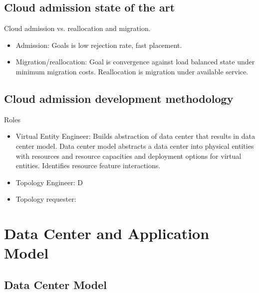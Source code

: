 \documentclass[conference]{IEEEtran}
\begin{document}
\subsection{Cloud admission state of the art}

Cloud admission vs. reallocation and migration.
\begin{itemize}
\item Admission: Goals is low rejection rate, fast placement.
\item Migration/reallocation: Goal is convergence against load balanced state under minimum migration costs. Reallocation is migration under available service.
\end{itemize}

\subsection{Cloud admission development methodology}

Roles
\begin{itemize}
	\item Virtual Entity Engineer: Builds abstraction of data center that results in data center model. Data center model abstracts a data center into physical entities with resources and resource capacities and deployment options for virtual entities. Identifies resource feature interactions.
	\item Topology Engineer: D
	\item Topology requester:
\end{itemize}
%

\section{Data Center and Application Model}

\subsection{Data Center Model}
\end{document}
